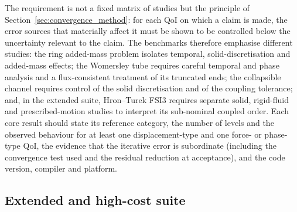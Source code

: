 The requirement is not a fixed matrix of studies but the principle of Section~\ref{sec:convergence_method}: for each QoI on which a claim is made, the error sources that materially affect it must be shown to be controlled below the uncertainty relevant to the claim.
The benchmarks therefore emphasise different studies: the ring added-mass problem isolates temporal, solid-discretisation and added-mass effects; the Womersley tube requires careful temporal and phase analysis and a flux-consistent treatment of its truncated ends; the collapsible channel requires control of the solid discretisation and of the coupling tolerance; and, in the extended suite, Hron--Turek FSI3 requires separate solid, rigid-fluid and prescribed-motion studies to interpret its sub-nominal coupled order.
Each core result should state its reference category, the number of levels and the observed behaviour for at least one displacement-type and one force- or phase-type QoI, the evidence that the iterative error is subordinate (including the convergence test used and the residual reduction at acceptance), and the code version, compiler and platform.


\subsection{Extended and high-cost suite}\label{sec:extended_suite}

